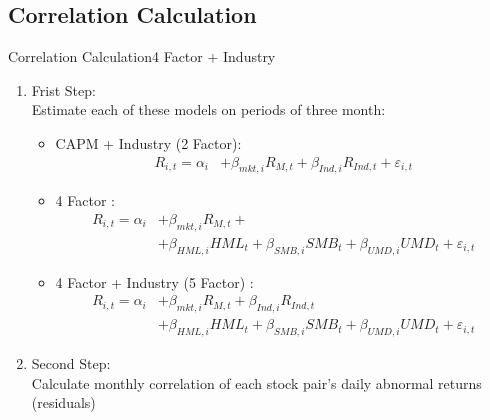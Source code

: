 \documentclass{beamer}
\begin{document}
	\subsection{Correlation Calculation}
	\begin{frame}{Correlation Calculation}{4 Factor + Industry}
		
		\begin{enumerate}
			\item Frist Step:\\
			\footnotesize
			Estimate each of these models on periods of three month:
			\begin{itemize}
				\item CAPM + Industry (2 Factor): 
				\begin{equation*}
					\begin{split}
						R_{i,t} =\alpha _{i}&+\beta _{mkt,i}{\mathit {R}}_{M,t} + \beta_{Ind,i}{\mathit {R}}_{Ind,t} + \boxed{\varepsilon_{i,t}}
					\end{split}
					\label{e12}
				\end{equation*}
				\item 4 Factor : 
				\begin{equation*}
					\begin{split}
						R_{i,t} =\alpha _{i}&+\beta _{mkt,i}{\mathit {R}}_{M,t} + \\
						&+\beta _{HML,i}{\mathit {HML}}_{t}+\beta _{SMB,i}{\mathit {SMB}}_{t}+\beta _{UMD,i}{\mathit {UMD}}_{t}+ \boxed{\varepsilon_{i,t}}
					\end{split}
					\label{e11}
				\end{equation*}
				
				\item 4 Factor + Industry (5 Factor) : 
				\begin{equation*}
					\begin{split}
						R_{i,t} =\alpha _{i}&+\beta _{mkt,i}{\mathit {R}}_{M,t} + \beta_{Ind,i}{\mathit {R}}_{Ind,t} \\
						&+\beta _{HML,i}{\mathit {HML}}_{t}+\beta _{SMB,i}{\mathit {SMB}}_{t}+\beta _{UMD,i}{\mathit {UMD}}_{t}+ \boxed{\varepsilon_{i,t}}
					\end{split}
					\label{e10}
				\end{equation*}
			\end{itemize}
			\normalsize
			\item Second Step:\\
			\footnotesize
			Calculate monthly correlation of each stock pair’s daily abnormal returns (residuals)
			
		\end{enumerate}
		
	\end{frame}
\end{document}

